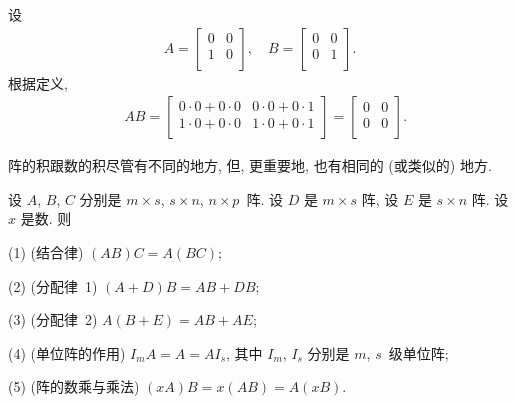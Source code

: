 \documentclass[%
    UTF8,%
    fontset=none,%
    punct=kaiming,%
    zihao=-4,%
    a4paper,%
    oneside,%
]{ctexbook}
\begin{document}
\begin{example}
    设
    \begin{align*}
        A = \begin{bmatrix}
                0 & 0 \\
                1 & 0 \\
            \end{bmatrix},
        \quad
        B = \begin{bmatrix}
                0 & 0 \\
                0 & 1 \\
            \end{bmatrix}.
    \end{align*}
    根据定义,
    \begin{align*}
         &
        AB = \begin{bmatrix}
                 0 \cdot 0 + 0 \cdot 0 & 0 \cdot 0 + 0 \cdot 1 \\
                 1 \cdot 0 + 0 \cdot 0 & 1 \cdot 0 + 0 \cdot 1 \\
             \end{bmatrix}
        = \begin{bmatrix}
              0 & 0 \\
              0 & 0 \\
          \end{bmatrix}.
    \end{align*}
\end{example}

阵的积跟数的积尽管有不同的地方,
但, 更重要地, 也有相同的 (或类似的) 地方.

\begin{theorem}
    设 \(A\), \(B\), \(C\) 分别是
    \(m \times s\), \(s \times n\), \(n \times p\)~阵.
    设 \(D\) 是 \(m \times s\) 阵,
    设 \(E\) 是 \(s \times n\) 阵.
    设 \(x\) 是数.
    则

    (1)
    (结合律)
    \((AB)C = A(BC)\);

    (2)
    (分配律~1)
    \((A + D) B = AB + DB\);

    (3)
    (分配律~2)
    \(A (B + E) = AB + AE\);

    (4)
    (单位阵的作用)
    \(I_m A = A = A I_s\),
    其中 \(I_m\), \(I_s\) 分别是 \(m\), \(s\)~级单位阵;

    (5)
    (阵的数乘与乘法)
    \((xA)B = x(AB) = A(xB)\).
\end{theorem}
\end{document}
